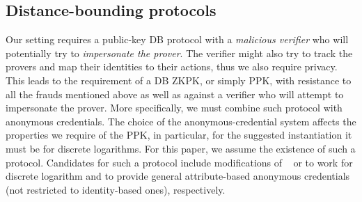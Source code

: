 \subsection{Distance-bounding protocols}%
\label{distance-bounding}


Our setting requires a public-key \ac{DB} protocol with a \emph{malicious verifier} who will potentially try to \emph{impersonate the prover}.
The verifier might also try to track the provers and map their identities to their actions, thus we also require privacy.
This leads to the requirement of a \ac{DB} \ac{ZKPK}, or simply \ac{PPK}, with resistance to all the frauds mentioned above as well as against a verifier who will attempt to impersonate the prover.
More specifically, we must combine such  protocol with anonymous 
credentials.
The choice of the anonymous-credential system affects the properties we 
require of the \ac{PPK}, in particular, for the suggested instantiation it must 
be  for discrete logarithms.
For this paper, we assume the existence of such a protocol. Candidates for such a protocol include modifications of ~\cite{ProProx} or \cite{PROPS} to work for discrete logarithm and to provide general attribute-based anonymous credentials (not restricted to identity-based ones), respectively.
